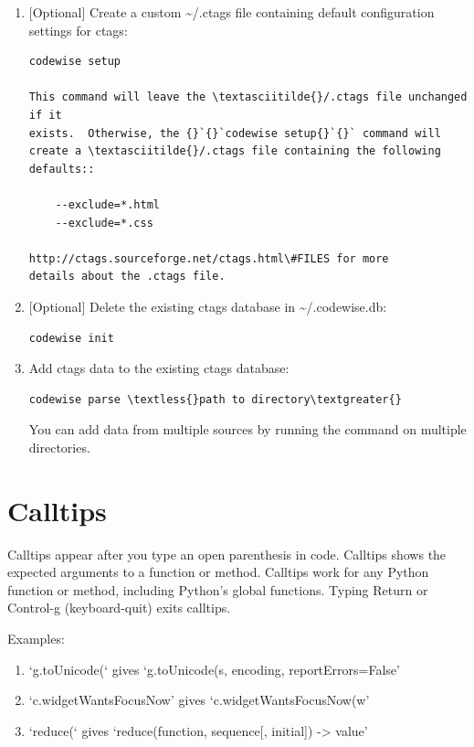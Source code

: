 \documentclass[a4paper,10pt,english]{sphinxmanual}
\begin{document}
\begin{enumerate}
\item {} 
{[}Optional{]} Create a custom \textasciitilde{}/.ctags file containing default
configuration settings for ctags:

\begin{Verbatim}[commandchars=\\\{\}]
    codewise setup

This command will leave the \textasciitilde{}/.ctags file unchanged if it
exists.  Otherwise, the {}`{}`codewise setup{}`{}` command will
create a \textasciitilde{}/.ctags file containing the following defaults::

    --exclude=*.html
    --exclude=*.css

http://ctags.sourceforge.net/ctags.html\#FILES for more
details about the .ctags file.
\end{Verbatim}

\item {} 
{[}Optional{]} Delete the existing ctags database in \textasciitilde{}/.codewise.db:

\begin{Verbatim}[commandchars=\\\{\}]
codewise init
\end{Verbatim}

\item {} 
Add ctags data to the existing ctags database:

\begin{Verbatim}[commandchars=\\\{\}]
codewise parse \textless{}path to directory\textgreater{}
\end{Verbatim}

You can add data from multiple sources by running
the  command on multiple directories.

\end{enumerate}


\section{Calltips}
\label{commands:calltips}
Calltips appear after you type an open parenthesis in code. Calltips shows the
expected arguments to a function or method. Calltips work for any Python
function or method, including Python's global functions. Typing Return or
Control-g (keyboard-quit) exits calltips.

Examples:
\begin{enumerate}
\item {} 
`g.toUnicode(`  gives `g.toUnicode(s, encoding, reportErrors=False'

\item {} 
`c.widgetWantsFocusNow' gives `c.widgetWantsFocusNow(w'

\item {} 
`reduce(` gives `reduce(function, sequence{[}, initial{]}) -\textgreater{} value'

\end{enumerate}
\end{document}
